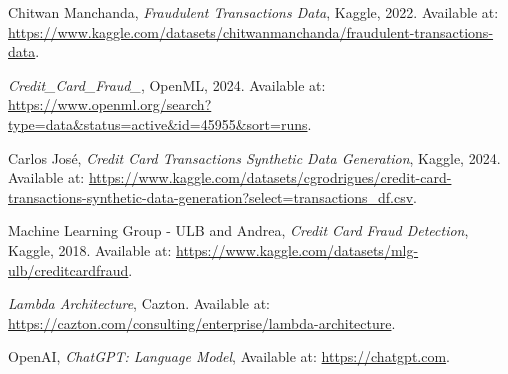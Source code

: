 \documentclass[12pt,a4paper, hidelinks]{article}
\begin{document}
\newpage

\begin{thebibliography}{9}

    Chitwan Manchanda,
    \textit{Fraudulent Transactions Data},
    Kaggle, 2022.
    Available at: \url{https://www.kaggle.com/datasets/chitwanmanchanda/fraudulent-transactions-data}.
    
    \textit{Credit\_Card\_Fraud\_},
    OpenML, 2024.
    Available at: \url{https://www.openml.org/search?type=data&status=active&id=45955&sort=runs}.

    Carlos José,
    \textit{Credit Card Transactions Synthetic Data Generation},
    Kaggle, 2024.
    Available at: \url{https://www.kaggle.com/datasets/cgrodrigues/credit-card-transactions-synthetic-data-generation?select=transactions_df.csv}.
    
    Machine Learning Group - ULB and Andrea,
    \textit{Credit Card Fraud Detection},
    Kaggle, 2018.
    Available at: \url{https://www.kaggle.com/datasets/mlg-ulb/creditcardfraud}.
    

    \textit{Lambda Architecture},
    Cazton.
    Available at: \url{https://cazton.com/consulting/enterprise/lambda-architecture}.

    OpenAI,
    \textit{ChatGPT: Language Model},
    Available at: \url{https://chatgpt.com}.
    
    \end{thebibliography}
\end{document}
